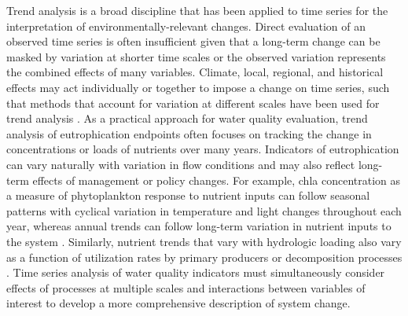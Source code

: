 \documentclass[journal = esthag, manuscript = article]{achemso}\usepackage[]{graphicx}\usepackage[]{color}
\begin{document}
Trend analysis is a broad discipline that has been applied to time series for the interpretation of environmentally-relevant changes.  Direct evaluation of an observed time series is often insufficient given that a long-term change can be masked by variation at shorter time scales or the observed variation represents the combined effects of many variables\cite{Oneill89,Levin92}. Climate, local, regional, and historical effects may act individually or together to impose a change on time series, such that methods that account for variation at different scales have been used for trend analysis \cite{Bhangu97,Champely97,Chang08,Halliday12}.  As a practical approach for water quality evaluation, trend analysis of eutrophication endpoints often focuses on tracking the change in concentrations or loads of nutrients over many years. Indicators of eutrophication can vary naturally with variation in flow conditions and may also reflect long-term effects of management or policy changes. For example, \ac{chla} concentration as a measure of phytoplankton response to nutrient inputs can follow seasonal patterns with cyclical variation in temperature and light changes throughout each year, whereas annual trends can follow long-term variation in nutrient inputs to the system \cite{Cloern96,Cloern10}. Similarly, nutrient trends that vary with hydrologic loading also vary as a function of utilization rates by primary producers or decomposition processes \cite{Sakamoto89,Schultz08,Harding16}. Time series analysis of water quality indicators must simultaneously consider effects of processes at multiple scales and interactions between variables of interest to develop a more comprehensive description of system change. 
\end{document}
